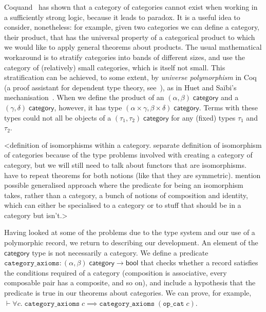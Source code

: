 \documentclass[twoside,titlepage,11pt]{article}
\begin{document}
Coquand~\cite{DBLP:conf/lics/Coquand86} has shown that a category of categories cannot exist when working in a sufficiently strong logic, because it leads to paradox.
It is a useful idea to consider, nonetheless: for example, given two categories we can define a category, their product, that has the universal property of a categorical product to which we would like to apply general theorems about products.
The usual mathematical workaround is to stratify categories into bands of different sizes, and use the category of (relatively) small categories, which is itself not small.
This stratification can be achieved, to some extent, by \emph{universe polymorphism} in Coq (a proof assistant for dependent type theory, see~\cite{DBLP:conf/tphol/Bertot08}), as in Huet and Sa{\"i}bi's mechanisation~\cite{DBLP:conf/birthday/HuetS00}.
When we define the product of an $(\alpha,\beta)\;\mathsf{category}$ and a $(\gamma,\delta)\;\mathsf{category}$, however, it has type $(\alpha\times\gamma,\beta\times\delta)\;\mathsf{category}$.
Terms with these types could not all be objects of a $(\tau_1,\tau_2)\;\mathsf{category}$ for any (fixed) types $\tau_1$ and $\tau_2$.

<definition of isomorphisms within a category. separate definition of isomorphism of categories because of the type problems involved with creating a category of category, but we will still need to talk about functors that are isomorphisms. have to repeat theorems for both notions (like that they are symmetric). mention possible generalised approach where the predicate for being an isomorphism takes, rather than a category, a bunch of notions of composition and identity, which can either be specialised to a category or to stuff that should be in a category but isn't.>

Having looked at some of the problems due to the type system and our use of a polymorphic record, we return to describing our development.
An element of the $\mathsf{category}$ type is not necessarily a category.
We define a predicate $\mathtt{category\_axioms}:(\alpha,\beta)\;\mathsf{category}\to\mathsf{bool}$ that checks whether a record satisfies the conditions required of a category (composition is associative, every composable pair has a composite, and so on), and include a hypothesis that the predicate is true in our theorems about categories.
We can prove, for example, $\vdash\forall{c}.\;\mathtt{category\_axioms}\;c\implies\mathtt{category\_axioms}\;(\mathtt{op\_cat}\;c)$.
\end{document}
